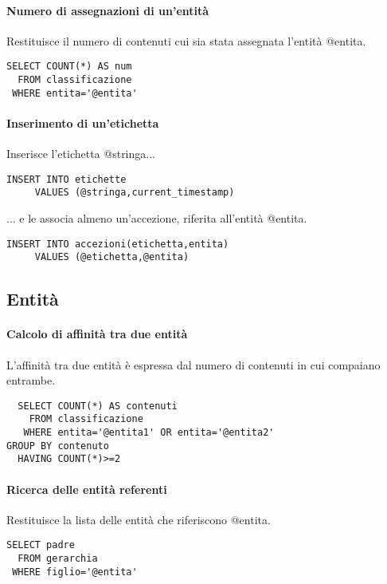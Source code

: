 \paragraph{Numero di assegnazioni di un'entità}
Restituisce il numero di contenuti cui sia stata assegnata l'entità \textsf{@entita}.

\begin{verbatim}
SELECT COUNT(*) AS num
  FROM classificazione
 WHERE entita='@entita'
\end{verbatim}

\paragraph{Inserimento di un'etichetta}
Inserisce l'etichetta \textsf{@stringa}...
	
\begin{verbatim}
INSERT INTO etichette
     VALUES (@stringa,current_timestamp)
\end{verbatim}

... e le associa almeno un'accezione, riferita all'entità \textsf{@entita}.

\begin{verbatim}
INSERT INTO accezioni(etichetta,entita)
     VALUES (@etichetta,@entita)
\end{verbatim}
	
\subsection*{Entità}
	
\paragraph{Calcolo di affinità tra due entità}
L'affinità tra due entità è espressa dal numero di contenuti in cui compaiano entrambe.
\begin{verbatim}
  SELECT COUNT(*) AS contenuti
    FROM classificazione
   WHERE entita='@entita1' OR entita='@entita2'
GROUP BY contenuto
  HAVING COUNT(*)>=2
\end{verbatim}

\paragraph{Ricerca delle entità referenti}
Restituisce la lista delle entità che riferiscono \textsf{@entita}.
\begin{verbatim}
SELECT padre
  FROM gerarchia
 WHERE figlio='@entita'
\end{verbatim}

